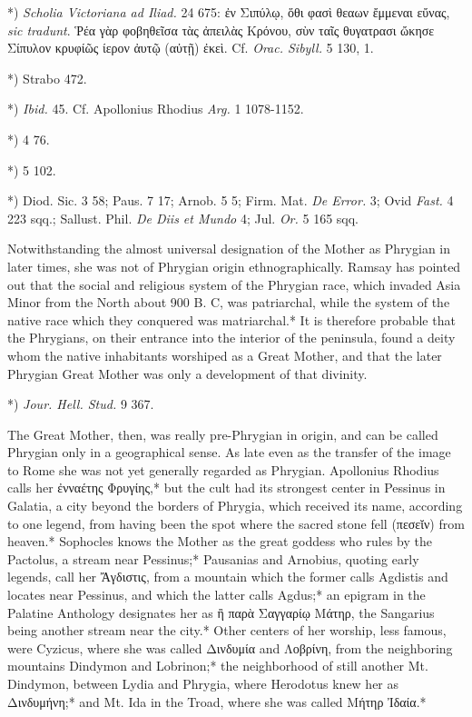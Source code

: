 \documentclass[a4paper, 11pt, oneside, polutonikogreek, english]{article}
\begin{document}
*) \emph{Scholia Victoriana ad Iliad.} 24 675: ἐν Σιπύλῳ, ὅθι φασὶ θεαων ἔμμεναι εὔνας, \emph{sic tradunt}. Ῥέα γὰρ φοβηθεῖσα τὰς ἀπειλὰς Κρόνου, σὺν ταῖς θυγατρασι ὤκησε Σίπυλον κρυφίῶς ίερον ἀυτῷ (αὐτῇ) ἐκεὶ. Cf. \emph{Orac. Sibyll.} 5 130, 1.

*) Strabo 472.

*) \emph{Ibid.} 45. Cf. Apollonius Rhodius \emph{Arg.} 1 1078-1152.

*) 4 76.

*) 5 102.

*) Diod. Sic. 3 58; Paus. 7 17; Arnob. 5 5; Firm. Mat. \emph{De Error.} 3; Ovid \emph{Fast.} 4 223 sqq.; Sallust. Phil. \emph{De Diis et Mundo} 4; Jul. \emph{Or.} 5 165 sqq.

Notwithstanding the almost universal designation of the Mother as Phrygian in later times, she was not of Phrygian origin ethnographically. Ramsay has pointed out that the social and religious system of the Phrygian race, which invaded Asia Minor from the North about 900 B. C, was patriarchal, while the system of the native race which they conquered was matriarchal.* It is therefore probable that the Phrygians, on their entrance into the interior of the peninsula, found a deity whom the native inhabitants worshiped as a Great Mother, and that the later Phrygian Great Mother was only a development of that divinity.

*) \emph{Jour. Hell. Stud.} 9 367.

The Great Mother, then, was really pre-Phrygian in origin, and can be called Phrygian only in a geographical sense. As late even as the transfer of the image to Rome she was not yet generally regarded as Phrygian. Apollonius Rhodius calls her ἐνναέτης Φρυγίης,* but the cult had its strongest center in Pessinus in Galatia, a city beyond the borders of Phrygia, which received its name, according to one legend, from having been the spot where the sacred stone fell (πεσεῐν) from heaven.* Sophocles knows the Mother as the great goddess who rules by the Pactolus, a stream near Pessinus;* Pausanias and Arnobius, quoting early legends, call her Ἄγδιστις, from a mountain which the former calls Agdistis and locates near Pessinus, and which the latter calls Agdus;* an epigram in the Palatine Anthology designates her as ἢ παρὰ Σαγγαρίῳ Μάτηρ, the Sangarius being another stream near the city.* Other centers of her worship, less famous, were Cyzicus, where she was called Δινδυμία and Λοβρίνη, from the neighboring mountains Dindymon and Lobrinon;* the neighborhood of still another Mt. Dindymon, between Lydia and Phrygia, where Herodotus knew her as Δινδυμήνη;* and Mt. Ida in the Troad, where she was called Μήτηρ Ἰδαία.*
\end{document}
